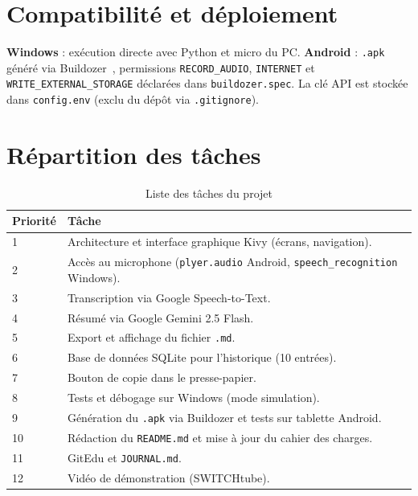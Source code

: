 \documentclass[a4paper,10pt]{article}
\begin{document}
\section{Compatibilité et déploiement}

\textbf{Windows} : exécution directe avec Python et micro du PC. \textbf{Android} : \texttt{.apk} généré via Buildozer~\cite{buildozer}, permissions \texttt{RECORD\_AUDIO}, \texttt{INTERNET} et \texttt{WRITE\_EXTERNAL\_STORAGE} déclarées dans \texttt{buildozer.spec}. La clé API est stockée dans \texttt{config.env} (exclu du dépôt via \texttt{.gitignore}).

\section{Répartition des tâches}

\begin{table}[H]
\centering
\caption{Liste des tâches du projet}
\label{tab:taches}
\footnotesize
\begin{tabular}{lp{9.5cm}}
\toprule
\textbf{Priorité} & \textbf{Tâche} \\
\midrule
1  & Architecture et interface graphique Kivy (écrans, navigation). \\
2  & Accès au microphone (\texttt{plyer.audio} Android, \texttt{speech\_recognition} Windows). \\
3  & Transcription via Google Speech-to-Text. \\
4  & Résumé via Google Gemini 2.5 Flash. \\
5  & Export et affichage du fichier \texttt{.md}. \\
6  & Base de données SQLite pour l'historique (10 entrées). \\
7  & Bouton de copie dans le presse-papier. \\
8  & Tests et débogage sur Windows (mode simulation). \\
9  & Génération du \texttt{.apk} via Buildozer et tests sur tablette Android. \\
10 & Rédaction du \texttt{README.md} et mise à jour du cahier des charges. \\
11 & GitEdu et \texttt{JOURNAL.md}. \\
12 & Vidéo de démonstration (SWITCHtube). \\
\bottomrule
\end{tabular}
\end{table}
\pagebreak
\end{document}
